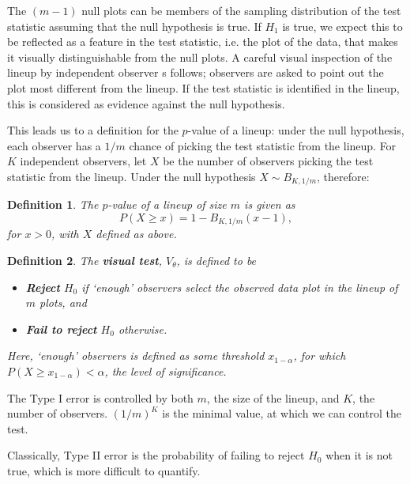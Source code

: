 \documentclass{article}
\newcommand{\red}[1]{{\color{red} #1}} %
\newtheorem{dfn}{Definition}[section]
\begin{document}
\noindent The $(m-1)$ null plots can be members of the sampling distribution of the test statistic assuming that the null hypothesis is true. If $H_1$ is true, we expect this to be reflected as a feature in the test statistic, i.e. the plot of the data, that makes it visually distinguishable from the null plots. A careful visual inspection of the lineup by %
independent observer\red{s} follows;  observers are asked to point out the plot most different from the lineup. If the test statistic is identified in the lineup, \red{this is considered as evidence against}
the null hypothesis. 

\red{This leads us to a definition for the $p$-value of a lineup: under the null hypothesis, each observer has a $1/m$ chance of picking the test statistic from the lineup.  For $K$ independent observers, let $X$ be  the number of observers picking the test statistic from the lineup. Under the null hypothesis $X \sim B_{K, 1/m}$, therefore:

\begin{dfn}\label{dfn:pvalue}
The $p$-value of a lineup of size $m$ is given as 
\[
P(X \ge x) = 1 - B_{K, 1/m} (x-1),
\]
for $x > 0$, with $X$ defined as above.
\end{dfn}


}

\begin{dfn}\label{dfn:test}
The \textbf{visual test}, $V_{\theta}$, is defined to be 
\begin{itemize}\itemsep-3pt
\item \textbf{Reject} $H_0$ if \red{`enough'} observers select the observed data plot in the lineup of $m$ plots, and
\item \textbf{Fail to reject} $H_0$  \red {otherwise}. %
\end{itemize}
\red{Here, `enough' observers is defined as some threshold $x_{1-\alpha}$, for which $P(X \ge x_{1-\alpha}) < \alpha$, the level of significance.}
\end{dfn}

\red{The Type I error is controlled by both $m$, the size of the lineup, and $K$, the number of observers. $(1/m)^K$ is the minimal value, at which we can control the test.}

Classically, Type II error is the probability of failing to reject $H_0$ when it is not true, which is more difficult to quantify. 
\end{document}
